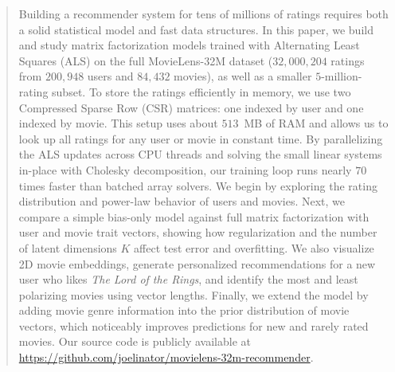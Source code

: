 \documentclass{article}
\theoremstyle{plain}
\theoremstyle{definition}
\begin{document}

\printAffiliationsAndNotice{}

\begin{abstract}
Building a recommender system for tens of millions of ratings requires both a solid statistical model and fast data structures. In this paper, we build and study matrix factorization models trained with Alternating Least Squares (ALS) on the full MovieLens-32M dataset ($32{,}000{,}204$ ratings from $200{,}948$ users and $84{,}432$ movies), as well as a smaller $5$-million-rating subset. To store the ratings efficiently in memory, we use two Compressed Sparse Row (CSR) matrices: one indexed by user and one indexed by movie. This setup uses about $513$~MB of RAM and allows us to look up all ratings for any user or movie in constant time. By parallelizing the ALS updates across CPU threads and solving the small linear systems in-place with Cholesky decomposition, our training loop runs nearly $70$ times faster than batched array solvers. We begin by exploring the rating distribution and power-law behavior of users and movies. Next, we compare a simple bias-only model against full matrix factorization with user and movie trait vectors, showing how regularization and the number of latent dimensions $K$ affect test error and overfitting. We also visualize 2D movie embeddings, generate personalized recommendations for a new user who likes \emph{The Lord of the Rings}, and identify the most and least polarizing movies using vector lengths. Finally, we extend the model by adding movie genre information into the prior distribution of movie vectors, which noticeably improves predictions for new and rarely rated movies. Our source code is publicly available at \url{https://github.com/joelinator/movielens-32m-recommender}.
\end{abstract}
\end{document}
